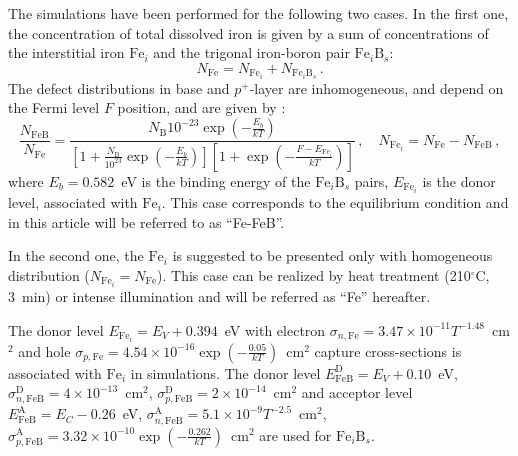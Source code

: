 \documentclass[num-refs]{wiley-article} %
\begin{document}
The simulations have been performed for the following two cases.
In the first one, the concentration of total dissolved iron is given by a sum of
concentrations of the interstitial iron $\mathrm{Fe}_i$
and the trigonal iron-boron pair $\mathrm{Fe}_i\mathrm{B}_s$:
\begin{equation}\label{eqNFeB}
  N_{\mathrm{Fe}}=N_{\mathrm{Fe}_i}+N_{\mathrm{Fe}_i\mathrm{B}_s}\,.
\end{equation}
The defect distributions in base and $p^+$-layer are inhomogeneous, and depend on the Fermi level $F$ position, and are given by
\cite{MurphyJAP2011,FeB:kinetic}:
\begin{equation}
\label{eqNFeB}
    \frac{N_{\mathrm{FeB}}}{N_{\mathrm{Fe}}}=\frac{N_\mathrm{B}10^{-23}\exp\left(-\frac{E_b}{kT}\right)}
     {\left[1+\frac{N_\mathrm{B}}{10^{23}}\exp\left(-\frac{E_b}{kT}\right)\right]\left[1+\exp\left(-\frac{F-E_{\mathrm{Fe}_i}}{kT}\right)\right]}\,,
     \quad N_{\mathrm{Fe}_i}=N_{\mathrm{Fe}}-N_{\mathrm{FeB}}\,,
\end{equation}
where
$E_b=0.582$~eV is the binding energy of the $\mathrm{Fe}_i\mathrm{B}_s$ pairs,
$E_{\mathrm{Fe}_i}$ is the donor level, associated with $\mathrm{Fe}_i$.
This case corresponds to the equilibrium condition and in this article will be referred to as ``Fe-FeB''.

In the second one, the $\mathrm{Fe}_i$ is suggested to be presented only with homogeneous distribution ($N_{\mathrm{Fe}_i}=N_{\mathrm{Fe}}$).
This case can be realized by heat treatment (210$^\circ$C, 3~min) \cite{FeB_Zong} or intense illumination \cite{FeBLight2} and will be referred as ``Fe'' hereafter.

The donor level $E_{\mathrm{Fe}_i} = E_V+0.394$~eV
with electron $\sigma_{n,{\mathrm{Fe}}}=3.47\times10^{-11}T^{-1.48}$~cm$^2$ and
hole $\sigma_{p,{\mathrm{Fe}}}=4.54\times10^{-16}\exp\left(-\frac{0.05}{kT}\right)$~cm$^2$ capture cross-sections \cite{MurphyJAP2011,ROUGIEUX2018}
is associated with $\mathrm{Fe}_i$ in simulations.
The donor level $E_{\mathrm{FeB}}^\mathrm{D}= E_V+0.10$~eV,
$\sigma_{n,{\mathrm{FeB}}}^\mathrm{D}=4\times10^{-13}$~cm$^2$,
$\sigma_{p,{\mathrm{FeB}}}^\mathrm{D}=2\times10^{-14}$~cm$^2$
and acceptor level $E_{\mathrm{FeB}}^\mathrm{A}= E_C-0.26$~eV,
$\sigma_{n,{\mathrm{FeB}}}^\mathrm{A}=5.1\times10^{-9}T^{-2.5}$~cm$^2$,
$\sigma_{p,{\mathrm{FeB}}}^\mathrm{A}=3.32\times10^{-10}\exp\left(-\frac{0.262}{kT}\right)$~cm$^2$
\cite{Istratov1999,MurphyJAP2011,ROUGIEUX2018}
are used for $\mathrm{Fe}_i\mathrm{B}_s$.
\end{document}

